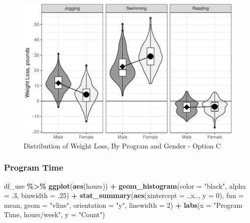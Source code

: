 \documentclass[
]{article}
\newenvironment{Shaded}{\begin{snugshade}}{\end{snugshade}}
\newcommand{\AttributeTok}[1]{\textcolor[rgb]{0.13,0.29,0.53}{#1}}
\newcommand{\DecValTok}[1]{\textcolor[rgb]{0.00,0.00,0.81}{#1}}
\newcommand{\FunctionTok}[1]{\textcolor[rgb]{0.13,0.29,0.53}{\textbf{#1}}}
\newcommand{\NormalTok}[1]{#1}
\newcommand{\SpecialCharTok}[1]{\textcolor[rgb]{0.81,0.36,0.00}{\textbf{#1}}}
\newcommand{\StringTok}[1]{\textcolor[rgb]{0.31,0.60,0.02}{#1}}
\begin{document}
\begin{figure}[hb]

\includegraphics{Appendix_ex_weightloss_files/figure-latex/unnamed-chunk-37-1} \hfill{}

\caption{Distribution of Weight Loss, By Program and Gender - Option C}\label{fig:unnamed-chunk-37}
\end{figure}

\clearpage

\hypertarget{program-time}{%
\subsubsection{Program Time}\label{program-time}}

\begin{Shaded}
\begin{Highlighting}[]
\NormalTok{df\_use }\SpecialCharTok{\%\textgreater{}\%} 
  \FunctionTok{ggplot}\NormalTok{(}\FunctionTok{aes}\NormalTok{(hours)) }\SpecialCharTok{+} 
  \FunctionTok{geom\_histogram}\NormalTok{(}\AttributeTok{color =} \StringTok{"black"}\NormalTok{,}
                 \AttributeTok{alpha =}\NormalTok{ .}\DecValTok{3}\NormalTok{,}
                 \AttributeTok{binwidth =}\NormalTok{ .}\DecValTok{25}\NormalTok{) }\SpecialCharTok{+}
  \FunctionTok{stat\_summary}\NormalTok{(}\FunctionTok{aes}\NormalTok{(}\AttributeTok{xintercept =}\NormalTok{ ..x.., }
                   \AttributeTok{y =} \DecValTok{0}\NormalTok{), }
               \AttributeTok{fun =}\NormalTok{ mean, }
               \AttributeTok{geom =} \StringTok{"vline"}\NormalTok{, }
               \AttributeTok{orientation =} \StringTok{"y"}\NormalTok{,}
               \AttributeTok{linewidth =} \DecValTok{2}\NormalTok{) }\SpecialCharTok{+}
  \FunctionTok{labs}\NormalTok{(}\AttributeTok{x =} \StringTok{"Program Time, hours/week"}\NormalTok{,}
       \AttributeTok{y =} \StringTok{"Count"}\NormalTok{) }
\end{Highlighting}
\end{Shaded}
\end{document}
